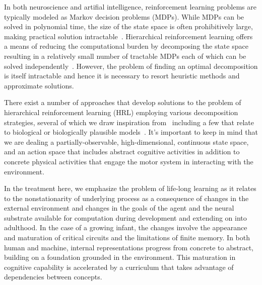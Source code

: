 



In both neuroscience and artifial intelligence, reinforcement learning problems are typically modeled as Markov decision problems (MDPs). While MDPs can be solved in polynomial time, the size of the state space is often prohibitively large, making practical solution intractable~\cite{LittmanetalUAI-95}. Hierarchical reinforcement learning offers a means of reducing the computational burden by decomposing the state space resulting in a relatively small number of tractable MDPs each of which can be solved independently~\cite{KaelblingICML-93,DietterichJAIR-00,HengstEMLDM-17}. However, the problem of finding an optimal decomposition is itself intractable and hence it is necessary to resort heuristic methods and approximate solutions.

There exist a number of approaches that develop solutions to the problem of hierarchical reinforcement learning (HRL) employing various decomposition strategies, several of which we draw inspiration from~\cite{NarasimhanetalJAIR-18,AndreasetalICML-17,SahnietalCoRR-17,KulkarnietalNIPS-16,BakkerandSchmidhuberIAS-04,MoffaertandNoweJMLR-14,PashevichetalCoRR-18} including a few that relate to biological or biologically plausible models~\cite{RasmussenetalPLoS-ONE-17,DiuketalCRMHOB-13,FrankandBadreCEREBRAL-CORTEX-12,RibasFernandesNEURON-11}. It's important to keep in mind that we are dealing a partially-observable, high-dimensional, continuous state space, and an action space that includes abstract cognitive activities in addition to concrete physical activities that engage the motor system in interacting with the environment. 

In the treatment here, we emphasize the problem of life-long learning as it relates to the nonstationarity of underlying process as a consequence of changes in the external environment and changes in the goals of the agent and the neural substrate available for computation during development and extending on into adulthood. In the case of a growing infant, the changes involve the appearance and maturation of critical circuits and the limitations of finite memory. In both human and machine, internal representations progress from concrete to abstract, building on a foundation grounded in the environment. This maturation in cognitive capability is accelerated by a curriculum that takes advantage of dependencies between concepts. 

